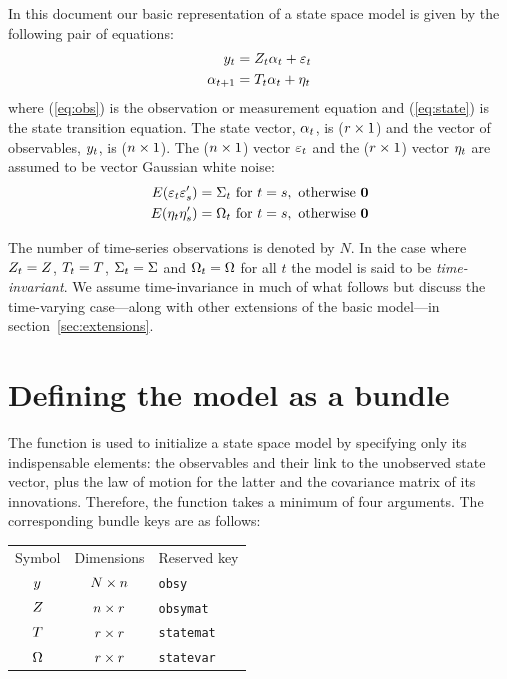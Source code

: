 In this document our basic representation of a state space model is
given by the following pair of equations:
%
\begin{align}
  \label{eq:obs}
  y_t &= Z_t \alpha_t + \varepsilon_t \\
  \label{eq:state}
  \alpha_{t+1} &= T_t \alpha_t + \eta_t
\end{align}
%
where (\ref{eq:obs}) is the observation or measurement equation and
(\ref{eq:state}) is the state transition equation.  The state vector,
$\alpha_{t}$, is ($r \times 1$) and the vector of observables,
$y_t$, is ($n \times 1$).  The ($n \times 1$) vector
$\varepsilon_t$ and the ($r \times 1$) vector $\eta_t$ are
assumed to be vector Gaussian white noise:
%
\begin{align*}
E(\varepsilon_t \varepsilon_s') &= \Sigma_t \mbox{ for } t = s,
    \mbox{ otherwise } \mathbf{0} \\
E(\eta_t \eta_s') &= \Omega_t \mbox{ for } t = s,
    \mbox{ otherwise } \mathbf{0}
\end{align*}

The number of time-series observations is denoted by $N$.  In the case
where $Z_t = Z$, $T_t = T$,
$\Sigma_t = \Sigma$ and $\Omega_t = \Omega$ for all $t$
the model is said to be \emph{time-invariant}. We assume
time-invariance in much of what follows but discuss the time-varying
case---along with other extensions of the basic model---in
section~\ref{sec:extensions}.

\section{Defining the model as a bundle}
\label{sec:setup}

The  function is used to initialize a state space model
by specifying only its indispensable elements: the observables and
their link to the unobserved state vector, plus the law of motion for
the latter and the covariance matrix of its innovations. Therefore,
the function takes a minimum of four arguments. The corresponding
bundle keys are as follows:

\begin{center}
\begin{tabular}{ccl}
Symbol & Dimensions & Reserved key \\[6pt]
$y$    & $N \times n$ & \texttt{obsy}\\
$Z$   & $n \times r$ & \texttt{obsymat}\\
$T$  & $r \times r$ & \texttt{statemat}\\
$\Omega$  & $r \times r$ & \texttt{statevar}\\
\end{tabular}
\end{center}

